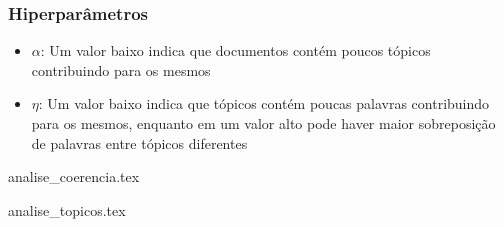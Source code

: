 \subsubsection{Hiperparâmetros}

\begin{itemize}
    \item $\alpha$: Um valor baixo indica que documentos contém poucos tópicos contribuindo para os mesmos
    \item $\eta$: Um valor baixo indica que tópicos contém poucas palavras contribuindo para os mesmos, enquanto em um valor alto pode haver maior sobreposição 
    de palavras entre tópicos diferentes
\end{itemize}

{analise_coerencia.tex}

{analise_topicos.tex}
